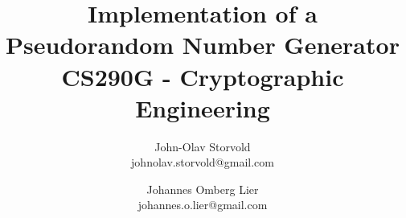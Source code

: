 \documentclass[a4paper,10pt]{article}
\title{
Implementation of a\\ Pseudorandom Number Generator\\
\Large{CS290G - Cryptographic Engineering}
}
\author{
\hfill John-Olav Storvold\\
\hfill johnolav.storvold@gmail.com\\
\and
Johannes Omberg Lier \hfill \hspace*{0pt}\\
johannes.o.lier@gmail.com \hfill \hspace*{0pt}\\
}
\begin{document}
\maketitle





\medskip

%
\end{document}
